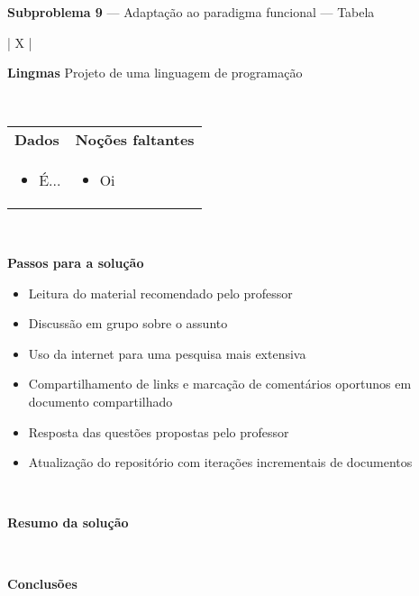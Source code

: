 \documentclass[12pt, a4paper]{article}
\begin{document}
\begin{center}
\large \textbf{Subproblema 9} --- Adaptação ao paradigma funcional --- Tabela
\end{center}

\bigskip

\begin{longtabu}{| X |}
    \hline
    \begin{center}
        \large \textbf{Lingmas} \linebreak
        Projeto de uma linguagem de programação
    \end{center}
    \\ \hline

    \begin{tabu}{ X | X }
        \textbf{Dados} &
        \textbf{Noções faltantes}
        \\
        \begin{minipage}[t]{\linewidth}
        \begin{itemize}[itemsep=.5ex,parsep=.0ex,after=\strut,leftmargin=15pt]
            \item É...
        \end{itemize}
        \end{minipage}
        &
        \begin{minipage}[t]{\linewidth}
        \begin{itemize}[itemsep=.5ex,parsep=.0ex,after=\strut,leftmargin=15pt]
            \item Oi
        \end{itemize}
        \end{minipage}
    \end{tabu}
    \\ \hline

    \textbf{Passos para a solução} \newline
    \begin{minipage}[t]{\linewidth}
    \begin{itemize}[itemsep=.5ex,parsep=.0ex,after=\strut,leftmargin=15pt]
        \item
        Leitura do material recomendado pelo professor
        \item
        Discussão em grupo sobre o assunto
        \item
        Uso da internet para uma pesquisa mais extensiva
        \item
        Compartilhamento de links e marcação de comentários oportunos em
        documento compartilhado
        \item
        Resposta das questões propostas pelo professor
        \item
        Atualização do repositório com iterações incrementais de documentos
    \end{itemize}
    \end{minipage}
    \\ \hline

    \textbf{Resumo da solução} \newline

    \\ \hline

    \textbf{Conclusões} \newline

    \\ \hline

\end{longtabu}
\end{document}
